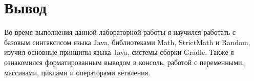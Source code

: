 \section{Вывод}
Во время выполнения данной лабораторной работы я научился работать с базовым синтаксисом языка Java,
библиотеками Math, StrictMath и Random, изучил основные принципы языка Java, системы сборки Gradle.
Также я ознакомился форматированным выводом в консоль, работой с переменными, массивами, циклами и операторами ветвления.